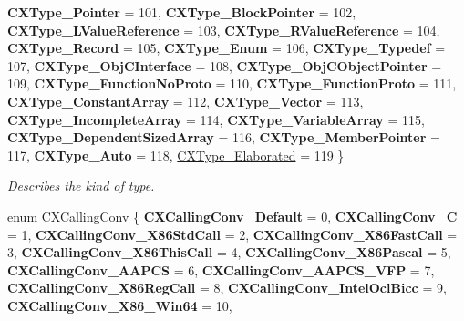 \begin{DoxyCompactItemize}
{\bfseries C\+X\+Type\+\_\+\+Pointer} = 101, 
{\bfseries C\+X\+Type\+\_\+\+Block\+Pointer} = 102, 
\newline
{\bfseries C\+X\+Type\+\_\+\+L\+Value\+Reference} = 103, 
{\bfseries C\+X\+Type\+\_\+\+R\+Value\+Reference} = 104, 
{\bfseries C\+X\+Type\+\_\+\+Record} = 105, 
{\bfseries C\+X\+Type\+\_\+\+Enum} = 106, 
\newline
{\bfseries C\+X\+Type\+\_\+\+Typedef} = 107, 
{\bfseries C\+X\+Type\+\_\+\+Obj\+C\+Interface} = 108, 
{\bfseries C\+X\+Type\+\_\+\+Obj\+C\+Object\+Pointer} = 109, 
{\bfseries C\+X\+Type\+\_\+\+Function\+No\+Proto} = 110, 
\newline
{\bfseries C\+X\+Type\+\_\+\+Function\+Proto} = 111, 
{\bfseries C\+X\+Type\+\_\+\+Constant\+Array} = 112, 
{\bfseries C\+X\+Type\+\_\+\+Vector} = 113, 
{\bfseries C\+X\+Type\+\_\+\+Incomplete\+Array} = 114, 
\newline
{\bfseries C\+X\+Type\+\_\+\+Variable\+Array} = 115, 
{\bfseries C\+X\+Type\+\_\+\+Dependent\+Sized\+Array} = 116, 
{\bfseries C\+X\+Type\+\_\+\+Member\+Pointer} = 117, 
{\bfseries C\+X\+Type\+\_\+\+Auto} = 118, 
\newline
\mbox{\hyperlink{group__CINDEX__TYPES_ggaad39de597b13a18882c21860f92b095aae4be029a6e7ee445186caafb14ef7b6b}{C\+X\+Type\+\_\+\+Elaborated}} = 119
 \}
\begin{DoxyCompactList}\small\item\em Describes the kind of type. \end{DoxyCompactList}\item 
\mbox{\label{group__CINDEX__TYPES_ga4a0e941ec7b4b64bf9eb3d0ed49d55ae}} 
enum \mbox{\hyperlink{group__CINDEX__TYPES_ga4a0e941ec7b4b64bf9eb3d0ed49d55ae}{C\+X\+Calling\+Conv}} \{ \newline
{\bfseries C\+X\+Calling\+Conv\+\_\+\+Default} = 0, 
{\bfseries C\+X\+Calling\+Conv\+\_\+C} = 1, 
{\bfseries C\+X\+Calling\+Conv\+\_\+\+X86\+Std\+Call} = 2, 
{\bfseries C\+X\+Calling\+Conv\+\_\+\+X86\+Fast\+Call} = 3, 
\newline
{\bfseries C\+X\+Calling\+Conv\+\_\+\+X86\+This\+Call} = 4, 
{\bfseries C\+X\+Calling\+Conv\+\_\+\+X86\+Pascal} = 5, 
{\bfseries C\+X\+Calling\+Conv\+\_\+\+A\+A\+P\+CS} = 6, 
{\bfseries C\+X\+Calling\+Conv\+\_\+\+A\+A\+P\+C\+S\+\_\+\+V\+FP} = 7, 
\newline
{\bfseries C\+X\+Calling\+Conv\+\_\+\+X86\+Reg\+Call} = 8, 
{\bfseries C\+X\+Calling\+Conv\+\_\+\+Intel\+Ocl\+Bicc} = 9, 
{\bfseries C\+X\+Calling\+Conv\+\_\+\+X86\+\_\+Win64} = 10, 

\end{DoxyCompactItemize}
